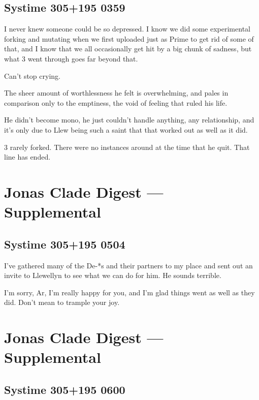 \hypertarget{systime-305195-0359}{%
\subsection*{Systime 305+195 0359}\label{systime-305195-0359}}

I never knew someone could be so depressed. I know we did some experimental forking and mutating when we first uploaded just as Prime to get rid of some of that, and I know that we all occasionally get hit by a big chunk of sadness, but what 3 went through goes far beyond that.

Can't stop crying.

The sheer amount of worthlessness he felt is overwhelming, and pales in comparison only to the emptiness, the void of feeling that ruled his life.

He didn't become mono, he just couldn't handle anything, any relationship, and it's only due to Llew being such a saint that that worked out as well as it did.

3 rarely forked. There were no instances around at the time that he quit. That line has ended.

\newpage
\hypertarget{jonas-clade-digest-supplemental-4}{%
\section*{Jonas Clade Digest --- Supplemental}\label{jonas-clade-digest-supplemental-4}}

\hypertarget{systime-305195-0504}{%
\subsection*{Systime 305+195 0504}\label{systime-305195-0504}}

I've gathered many of the De-*s and their partners to my place and sent out an invite to Llewellyn to see what we can do for him. He sounds terrible.

I'm sorry, Ar, I'm really happy for you, and I'm glad things went as well as they did. Don't mean to trample your joy.

\newpage
\hypertarget{jonas-clade-digest-supplemental-5}{%
\section*{Jonas Clade Digest --- Supplemental}\label{jonas-clade-digest-supplemental-5}}

\hypertarget{systime-305195-0600}{%
\subsection*{Systime 305+195 0600}\label{systime-305195-0600}}

